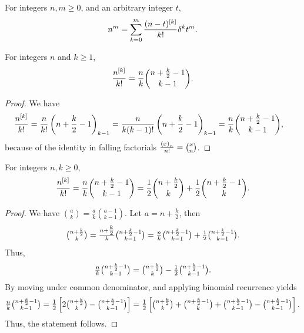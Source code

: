 \begin{lemma}
  \label{prop:newtons-formula-for-powers}
  For integers $n,m \geq 0$, and an arbitrary integer $t$,
  \begin{align*}
    n^m = \sum_{k=0}^{m} \frac{(n-t)^{[k]}}{k!} \delta^{k} t^m.
  \end{align*}
\end{lemma}

\begin{lemma}
  \label{lem:binomial-form-of-central-factorials}
  For integers $n$ and $k \geq 1$,
  \begin{align*}
    \frac{n^{[k]}}{k!}
    = \frac{n}{k} \binom{n+\frac{k}{2}-1}{k-1}.
  \end{align*}
  \begin{proof}
    We have
    \begin{align*}
      \frac{n^{[k]}}{k!}
      &= \frac{n}{k!}\left(n+\frac{k}{2}-1\right)_{k-1}
      = \frac{n}{k (k-1)!} \left(n+\frac{k}{2}-1\right)_{k-1}
      = \frac{n}{k} \binom{n+\frac{k}{2}-1}{k-1},
    \end{align*}
    because of the identity in falling factorials
    $\frac{\left(x\right)_{n}}{n!} = \binom{x}{n}$.
  \end{proof}
\end{lemma}

\begin{lemma}
  \label{lem:halved-central-factorials}
  For integers $n,k\geq 0$,
  \begin{align*}
    \frac{n^{[k]}}{k!}
    = \frac{n}{k} \binom{n+\frac{k}{2}-1}{k-1}
    = \frac{1}{2} \binom{n+\frac{k}{2}}{k} + \frac{1}{2} \binom{n+\frac{k}{2}-1}{k}.
  \end{align*}
  \begin{proof}
    We have $\binom{a}{k} = \frac{a}{k} \binom{a-1}{k-1}$.
    Let $a=n + \frac{k}{2}$, then
    \begin{align*}
      \tbinom{n + \frac{k}{2}}{k} = \tfrac{n + \tfrac{k}{2}}{k} \tbinom{n+\frac{k}{2}-1}{k-1}
      = \tfrac{n}{k} \tbinom{n+\frac{k}{2}-1}{k-1} + \tfrac{1}{2} \tbinom{n+\frac{k}{2}-1}{k-1}.
    \end{align*}
    Thus,
    \begin{align*}
      \tfrac{n}{k} \tbinom{n+\frac{k}{2}-1}{k-1} = \tbinom{n + \frac{k}{2}}{k} - \tfrac{1}{2} \tbinom{n+\frac{k}{2}-1}{k-1}.
    \end{align*}
    By moving under common denominator, and applying binomial recurrence yields
    \begin{align*}
      \tfrac{n}{k} \tbinom{n+\frac{k}{2}-1}{k-1}
      = \tfrac{1}{2}
      \left[
        2 \tbinom{n + \frac{k}{2}}{k} - \tbinom{n+\frac{k}{2}-1}{k-1}
      \right]
      = \tfrac{1}{2}
      \left[
        \tbinom{n + \frac{k}{2}}{k} + \tbinom{n + \frac{k}{2}-1}{k} + \tbinom{n + \frac{k}{2}-1}{k-1} - \tbinom{n+\frac{k}{2}-1}{k-1}
      \right].
    \end{align*}
    Thus, the statement follows.
  \end{proof}
\end{lemma}

